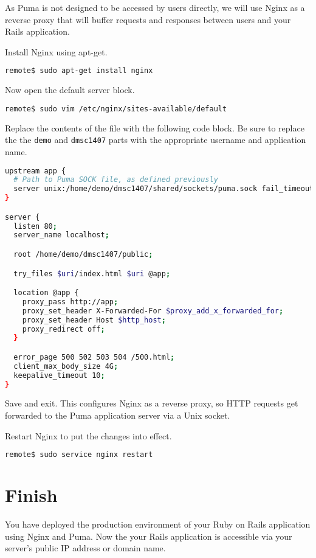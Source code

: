 As Puma is not designed to be accessed by users directly,
we will use Nginx as a reverse proxy
that will buffer requests and responses between
users and your Rails application.

Install Nginx using apt-get.

\begin{minipage}{\linewidth}
\begin{lstlisting}[language=bash]
remote$ sudo apt-get install nginx
\end{lstlisting}
\end{minipage}

Now open the default server block.

\begin{minipage}{\linewidth}
\begin{lstlisting}[language=bash]
remote$ sudo vim /etc/nginx/sites-available/default
\end{lstlisting}
\end{minipage}

Replace the contents of the file with the following code block.
Be sure to replace the the \texttt{demo} and \texttt{dmsc1407} parts
with the appropriate username and application name.

\begin{minipage}{\linewidth}
  \begin{lstlisting}[language=bash, caption={/etc/nginx/sites-available/default}]
upstream app {
  # Path to Puma SOCK file, as defined previously
  server unix:/home/demo/dmsc1407/shared/sockets/puma.sock fail_timeout=0;
}

server {
  listen 80;
  server_name localhost;

  root /home/demo/dmsc1407/public;

  try_files $uri/index.html $uri @app;

  location @app {
    proxy_pass http://app;
    proxy_set_header X-Forwarded-For $proxy_add_x_forwarded_for;
    proxy_set_header Host $http_host;
    proxy_redirect off;
  }

  error_page 500 502 503 504 /500.html;
  client_max_body_size 4G;
  keepalive_timeout 10;
}
\end{lstlisting}
\end{minipage}

Save and exit. This configures Nginx as a reverse proxy, so HTTP requests
get forwarded to the Puma application server via a Unix socket.

Restart Nginx to put the changes into effect.

\begin{minipage}{\linewidth}
\begin{lstlisting}[language=bash]
remote$ sudo service nginx restart
\end{lstlisting}
\end{minipage}

\section{Finish}

You have deployed the production environment of your Ruby on Rails application using Nginx and Puma.
Now the your Rails application is accessible via your server's public IP address
or domain name.
